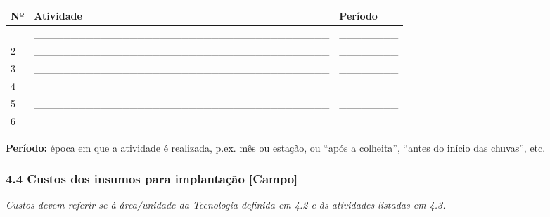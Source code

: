 {
\begin{longtable}[]{@{}lll@{}}
\toprule\noalign{}
Nº & Atividade & Período \\
\midrule\noalign{}
\endhead
\bottomrule\noalign{}
\endlastfoot
1 & \_\_\_\_\_\_\_\_\_\_\_\_\_\_\_\_\_\_\_\_\_\_\_\_\_\_\_\_\_\_\_\_\_\_\_\_\_\_\_\_ & \_\_\_\_\_\_\_\_ \\
2 & \_\_\_\_\_\_\_\_\_\_\_\_\_\_\_\_\_\_\_\_\_\_\_\_\_\_\_\_\_\_\_\_\_\_\_\_\_\_\_\_ & \_\_\_\_\_\_\_\_ \\
3 & \_\_\_\_\_\_\_\_\_\_\_\_\_\_\_\_\_\_\_\_\_\_\_\_\_\_\_\_\_\_\_\_\_\_\_\_\_\_\_\_ & \_\_\_\_\_\_\_\_ \\
4 & \_\_\_\_\_\_\_\_\_\_\_\_\_\_\_\_\_\_\_\_\_\_\_\_\_\_\_\_\_\_\_\_\_\_\_\_\_\_\_\_ & \_\_\_\_\_\_\_\_ \\
5 & \_\_\_\_\_\_\_\_\_\_\_\_\_\_\_\_\_\_\_\_\_\_\_\_\_\_\_\_\_\_\_\_\_\_\_\_\_\_\_\_ & \_\_\_\_\_\_\_\_ \\
6 & \_\_\_\_\_\_\_\_\_\_\_\_\_\_\_\_\_\_\_\_\_\_\_\_\_\_\_\_\_\_\_\_\_\_\_\_\_\_\_\_ & \_\_\_\_\_\_\_\_ \\
\end{longtable}
}

\textbf{Período:} época em que a atividade é realizada, p.ex. mês ou estação, ou ``após a colheita'', ``antes do início das chuvas'', etc.

\subsubsection{4.4 Custos dos insumos para implantação {[Campo]}}\label{custos-dos-insumos-para-implantauxe7uxe3o}

\emph{Custos devem referir-se à área/unidade da Tecnologia definida em 4.2 e às atividades listadas em 4.3.}

